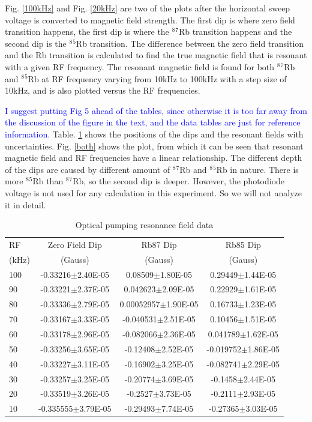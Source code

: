 \documentclass[prb,preprint]{revtex4-1}
\begin{document}
Fig. \ref{100kHz} and Fig. \ref{20kHz} are two of the plots after the horizontal sweep voltage is converted to magnetic field strength. The first dip is where zero field transition happens, the first dip is where the  $^8$$^7$Rb transition happens and the second dip is the $^8$$^5$Rb transition. The difference between the zero field transition and the Rb transition is calculated to find the true magnetic field that is resonant with a given RF frequency. The resonant magnetic field is found for both $^8$$^7$Rb and $^8$$^5$Rb at RF frequency varying from 10kHz to 100kHz with a step size of 10kHz, and is also plotted versus the RF frequencies. 

\textcolor{blue}{I suggest putting Fig 5 ahead of the tables, since otherwise it is too far away from the discussion of the figure in the text, and the data tables are just for reference information}. 
Table. \ref{data} shows the positions of the dips and the resonant fields with uncertainties. Fig. \ref{both} shows the plot, from which it can be seen that resonant magnetic field and RF frequencies have a linear relationship. The different depth of the dips are caused by different amount of $^8$$^7$Rb and $^8$$^5$Rb in nature. There is more $^8$$^5$Rb than $^8$$^7$Rb, so the second dip is deeper. However, the photodiode voltage is not used for any calculation in this experiment. So we will not analyze it in detail.

\begin{table}[h]
\centering
\caption{Optical pumping resonance field data}
\begin{ruledtabular}
\begin{tabular}{ l c c c}
RF & Zero Field Dip & Rb87 Dip & Rb85 Dip\\
(kHz) & (Gauss) & (Gauss) & (Gauss)\\
\hline
100	& -0.33216$\pm$2.40E-05 & 0.08509$\pm$1.80E-05 & 0.29449$\pm$1.44E-05\\
90&-0.33221$\pm$2.37E-05&0.042623$\pm$2.09E-05&0.22929$\pm$1.61E-05\\
80&-0.33336$\pm$2.79E-05&0.00052957$\pm$1.90E-05&0.16733$\pm$1.23E-05\\
70&-0.33167$\pm$3.33E-05&-0.040531$\pm$2.51E-05&0.10456$\pm$1.51E-05\\
60&-0.33178$\pm$2.96E-05&-0.082066$\pm$2.36E-05&0.041789$\pm$1.62E-05\\
50&-0.33256$\pm$3.65E-05&-0.12408$\pm$2.52E-05&-0.019752$\pm$1.86E-05\\
40&-0.33227$\pm$3.11E-05&-0.16902$\pm$3.25E-05&-0.082741$\pm$2.29E-05\\
30&-0.33257$\pm$3.25E-05&-0.20774$\pm$3.69E-05&-0.1458$\pm$2.44E-05	\\
20&-0.33519$\pm$3.26E-05&-0.2527$\pm$3.73E-05&-0.2111$\pm$2.93E-05\\
10	&-0.335555$\pm$3.79E-05&-0.29493$\pm$7.74E-05&-0.27365$\pm$3.03E-05\\

\end{tabular}
\end{ruledtabular}
\label{data}
\end{table}
\end{document}
